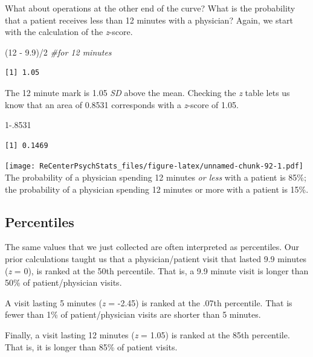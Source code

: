 \documentclass[
  11pt,
]{book}
\newenvironment{Shaded}{\begin{snugshade}}{\end{snugshade}}
\newcommand{\CommentTok}[1]{\textcolor[rgb]{0.56,0.35,0.01}{\textit{#1}}}
\newcommand{\DecValTok}[1]{\textcolor[rgb]{0.00,0.00,0.81}{#1}}
\newcommand{\FloatTok}[1]{\textcolor[rgb]{0.00,0.00,0.81}{#1}}
\newcommand{\NormalTok}[1]{#1}
\newcommand{\SpecialCharTok}[1]{\textcolor[rgb]{0.00,0.00,0.00}{#1}}
\begin{document}
What about operations at the other end of the curve? What is the probability that a patient receives less than 12 minutes with a physician? Again, we start with the calculation of the \emph{z}-score.

\begin{Shaded}
\begin{Highlighting}[]
\NormalTok{(}\DecValTok{12} \SpecialCharTok{{-}} \FloatTok{9.9}\NormalTok{)}\SpecialCharTok{/}\DecValTok{2}  \CommentTok{\#for 12 minutes}
\end{Highlighting}
\end{Shaded}

\begin{verbatim}
[1] 1.05
\end{verbatim}

The 12 minute mark is 1.05 \emph{SD} above the mean. Checking the \emph{z} table lets us know that an area of 0.8531 corresponds with a \emph{z}-score of 1.05.

\begin{Shaded}
\begin{Highlighting}[]
\DecValTok{1}\FloatTok{{-}.8531}
\end{Highlighting}
\end{Shaded}

\begin{verbatim}
[1] 0.1469
\end{verbatim}

\texttt{[image: ReCenterPsychStats\_files/figure-latex/unnamed-chunk-92-1.pdf]}
The probability of a physician spending 12 minutes \emph{or less} with a patient is 85\%; the probability of a physician spending 12 minutes or more with a patient is 15\%.

\hypertarget{percentiles}{%
\subsection{Percentiles}\label{percentiles}}

The same values that we just collected are often interpreted as percentiles. Our prior calculations taught us that a physician/patient visit that lasted 9.9 minutes (\emph{z} = 0), is ranked at the 50th percentile. That is, a 9.9 minute visit is longer than 50\% of patient/physician visits.

A visit lasting 5 minutes (\emph{z} = -2.45) is ranked at the .07th percentile. That is fewer than 1\% of patient/physician visits are shorter than 5 minutes.

Finally, a visit lasting 12 minutes (\emph{z} = 1.05) is ranked at the 85th percentile. That is, it is longer than 85\% of patient visits.
\end{document}
